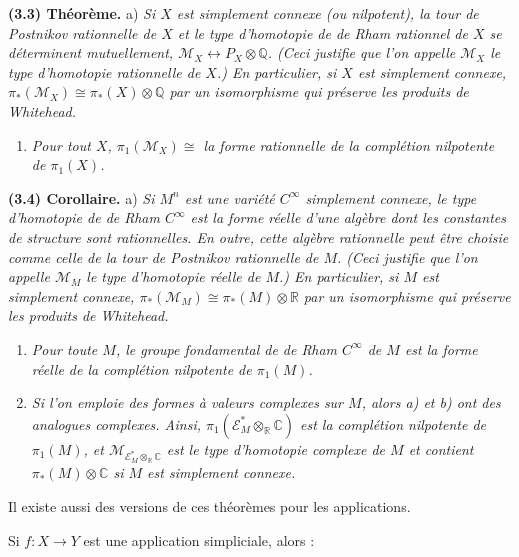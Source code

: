 \documentclass[
  french,
  a3paper,
  a3paper]{extarticle}
\providecommand{\tightlist}{%
  \setlength{\itemsep}{0pt}\setlength{\parskip}{0pt}}
\begin{document}
\textbf{(3.3) Théorème.} a) \emph{Si \(X\) est simplement connexe (ou
nilpotent), la tour de Postnikov rationnelle de \(X\) et le type
d'homotopie de de Rham rationnel de \(X\) se déterminent mutuellement,
\(\mathcal M_X\longleftrightarrow P_X\otimes\mathbb Q\). (Ceci justifie
que l'on appelle \(\mathcal M_X\) le type d'homotopie rationnelle de
\(X\).) En particulier, si \(X\) est simplement connexe,
\(\pi_*(\mathcal M_X)\cong\pi_*(X)\otimes\mathbb Q\) par un isomorphisme
qui préserve les produits de Whitehead.}

\begin{enumerate}
\def\labelenumi{\alph{enumi})}
\setcounter{enumi}{1}
\tightlist
\item
  \emph{Pour tout \(X\), \(\pi_1(\mathcal M_X)\cong\) la forme
  rationnelle de la complétion nilpotente de \(\pi_1(X)\).}
\end{enumerate}

\textbf{(3.4) Corollaire.} a) \emph{Si \(M^n\) est une variété
\(C^\infty\) simplement connexe, le type d'homotopie de de Rham
\(C^\infty\) est la forme réelle d'une algèbre dont les constantes de
structure sont rationnelles. En outre, cette algèbre rationnelle peut
être choisie comme celle de la tour de Postnikov rationnelle de \(M\).
(Ceci justifie que l'on appelle \(\mathcal M_M\) le type d'homotopie
réelle de \(M\).) En particulier, si \(M\) est simplement connexe,
\(\pi_*(\mathcal M_M)\cong\pi_*(M)\otimes\mathbb R\) par un isomorphisme
qui préserve les produits de Whitehead.}

\begin{enumerate}
\def\labelenumi{\alph{enumi})}
\setcounter{enumi}{1}
\item
  \emph{Pour toute \(M\), le groupe fondamental de de Rham \(C^\infty\)
  de \(M\) est la forme réelle de la complétion nilpotente de
  \(\pi_1(M)\).}
\item
  \emph{Si l'on emploie des formes à valeurs complexes sur \(M\), alors
  a) et b) ont des analogues complexes. Ainsi,
  \(\pi_1(\mathcal E_M^*\otimes_{\mathbb R}\mathbb C)\) est la
  complétion nilpotente de \(\pi_1(M)\), et
  \(\mathcal M_{\mathcal E_M^*\otimes_{\mathbb R}\mathbb C}\) est le
  type d'homotopie complexe de \(M\) et contient
  \(\pi_*(M)\otimes\mathbb C\) si \(M\) est simplement connexe.}
\end{enumerate}

Il existe aussi des versions de ces théorèmes pour les applications.

Si \(f:X\longrightarrow Y\) est une application simpliciale, alors :
\end{document}
